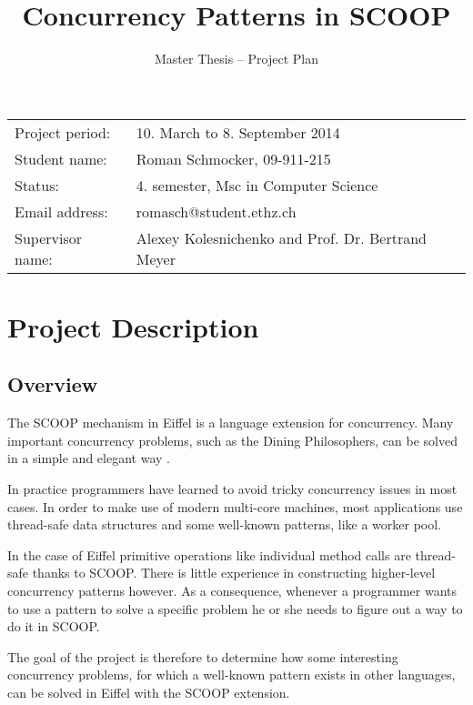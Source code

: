 \documentclass[a4paper,10pt]{article}
\title{Concurrency Patterns in SCOOP}
\author{Master Thesis -- Project Plan}
\date{}
\begin{document}
\maketitle
\begin{flushleft}

\begin{tabular}{ll}
Project period: & 10. March to 8. September 2014 \\
Student name:  & Roman Schmocker, 09-911-215 \\
Status: & 4. semester, Msc in Computer Science \\
Email address: & romasch@student.ethz.ch \\
Supervisor name: & Alexey Kolesnichenko and Prof. Dr. Bertrand Meyer
\end{tabular}
\end{flushleft}

\section  {Project Description}
\label {sec:project-description}

\subsection {Overview}

The SCOOP \cite{Nienaltowski07} \cite{ScoopWeb} mechanism in Eiffel \cite{EcmaEiffel} \cite{Meyer09} is a language extension for concurrency. 
Many important concurrency problems, such as the Dining Philosophers, can be solved in a simple and elegant way \cite{ScoopExamples}.

In practice programmers have learned to avoid tricky concurrency issues in most cases.
In order to make use of modern multi-core machines, most applications use thread-safe data structures and some well-known patterns, like a worker pool.

In the case of Eiffel primitive operations like individual method calls are thread-safe thanks to SCOOP.
There is little experience in constructing higher-level concurrency patterns however.
As a consequence, whenever a programmer wants to use a pattern to solve a specific problem he or she needs to figure out a way to do it in SCOOP.

The goal of the project is therefore to determine how some interesting concurrency problems, for which a well-known pattern exists in other languages, can be solved in Eiffel with the SCOOP extension.
\end{document}
